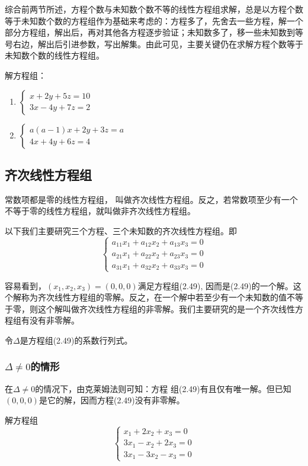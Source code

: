 综合前两节所述，方程个数与未知数个数不等的线性方程组求解，总是以方程个数等于未知数个数的方程组作为基础来考虑的：方程多了，先舍去一些方程，解一个部分方程组，解出后，再对其他各方程逐步验证；未知数多了，移一些未知数到等号右边，解出后引进参数，写出解集。由此可见，主要关键仍在求解方程个数等于未知数个数的线性方程组。

\begin{ex}
解方程组：
\begin{multicols}{2}
 \begin{enumerate}
    \item $\begin{cases}
        x+2y+5z=10\\3x-4y+7z=2
    \end{cases}$
    \item $\begin{cases}
        a(a-1)x+2y+3z=a\\ 4x+4y+6z=4
    \end{cases}$
\end{enumerate}   
\end{multicols}
\end{ex}

\subsection{齐次线性方程组}
常数项都是零的线性方程组，
叫做齐次线性方程组。反之，若常数项至少有一个不等于零的线性方程组，就叫做非齐次线性方程组。

以下我们主要研究三个方程、三个未知数的齐次线性方程组。即
\begin{equation}
    \begin{cases}
a_{11}x_1+a_{12}x_2+a_{13}x_3=0\\
a_{21}x_1+a_{22}x_2+a_{23}x_3=0\\
a_{31}x_1+a_{32}x_2+a_{33}x_3=0
    \end{cases}
\end{equation}

容易看到，$(x_1,x_2,x_3)=(0, 0, 0)$满足方程组(2.49), 因而是(2.49)的一个解。这个解称为齐次线性方程组的零解。反之，在一个解中若至少有一个未知数的值不等于零，则这个解叫做齐次线性方程组的非零解。我们主要研究的是一个齐次线性方程组有没有非零解。

令$\Delta$是方程组(2.49)的系数行列式。

\subsubsection{$\Delta\ne 0$的情形}
在$\Delta\ne 0$的情况下，由克莱姆法则可知：方程
组(2.49)有且仅有唯一解。但已知$(0, 0, 0)$是它的解，因而方程(2.49)没有非零解。
\begin{example}
解方程组 \[\begin{cases}
    x_1+2x_2+x_3=0\\
3x_1-x_2+2x_3=0\\
3x_1-3x_2-x_3=0
\end{cases}\]
\end{example}


